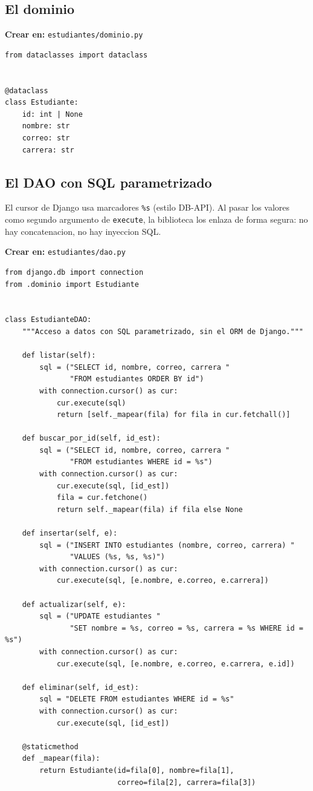 \subsection{El dominio}
\label{ap:crud:django:dominio}

{\small\textbf{Crear en:} \texttt{estudiantes/dominio.py}}
\begin{lstlisting}[style=python,caption={dominio.py (la clase Estudiante)},label={lst:dj-dominio}]
from dataclasses import dataclass


@dataclass
class Estudiante:
    id: int | None
    nombre: str
    correo: str
    carrera: str
\end{lstlisting}

\subsection{El DAO con SQL parametrizado}
\label{ap:crud:django:dao}

El cursor de Django usa marcadores \texttt{\%s} (estilo DB-API). Al
pasar los valores como segundo argumento de \texttt{execute}, la
biblioteca los enlaza de forma segura: no hay concatenacion, no hay
inyeccion SQL.

{\small\textbf{Crear en:} \texttt{estudiantes/dao.py}}
\begin{lstlisting}[style=python,caption={dao.py (CRUD con cursor, sin el ORM)},label={lst:dj-dao}]
from django.db import connection
from .dominio import Estudiante


class EstudianteDAO:
    """Acceso a datos con SQL parametrizado, sin el ORM de Django."""

    def listar(self):
        sql = ("SELECT id, nombre, correo, carrera "
               "FROM estudiantes ORDER BY id")
        with connection.cursor() as cur:
            cur.execute(sql)
            return [self._mapear(fila) for fila in cur.fetchall()]

    def buscar_por_id(self, id_est):
        sql = ("SELECT id, nombre, correo, carrera "
               "FROM estudiantes WHERE id = %s")
        with connection.cursor() as cur:
            cur.execute(sql, [id_est])
            fila = cur.fetchone()
            return self._mapear(fila) if fila else None

    def insertar(self, e):
        sql = ("INSERT INTO estudiantes (nombre, correo, carrera) "
               "VALUES (%s, %s, %s)")
        with connection.cursor() as cur:
            cur.execute(sql, [e.nombre, e.correo, e.carrera])

    def actualizar(self, e):
        sql = ("UPDATE estudiantes "
               "SET nombre = %s, correo = %s, carrera = %s WHERE id = %s")
        with connection.cursor() as cur:
            cur.execute(sql, [e.nombre, e.correo, e.carrera, e.id])

    def eliminar(self, id_est):
        sql = "DELETE FROM estudiantes WHERE id = %s"
        with connection.cursor() as cur:
            cur.execute(sql, [id_est])

    @staticmethod
    def _mapear(fila):
        return Estudiante(id=fila[0], nombre=fila[1],
                          correo=fila[2], carrera=fila[3])
\end{lstlisting}


